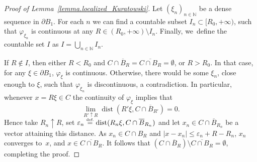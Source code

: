 \documentclass[10pt]{amsart}
\theoremstyle{definition}
\newcommand{\eqdef}{\ensuremath{\stackrel{\mbox{\upshape\tiny def.}}{=}}}
\DeclareMathOperator{\dist}{dist}
\newcommand{\oB}{\overline{B}}
\begin{document}
\begin{proof}[Proof of Lemma~\ref{lemma.localized_Kuratowski}]
Let $(\xi_n)_{n \in \mathbb{N}}$ be a dense sequence in $\partial B_1$.
For each $n$ we can find a countable subset $I_n\subset [R_0,+\infty)$, such that $\varphi_{\xi_n}$
is continuous at any $R\in (R_0,+\infty)\setminus I_n$.
Finally, we~define the countable set $I$ as
$
I= \bigcup_{n\in \mathbb{N}} I_n.
$

If $R\not\in I$, then either $R<R_0$ and
$C\cap\oB_R=\overline{C\cap B_R}=\emptyset$, or
$R>R_0$. In that case, for any $\xi\in\partial B_1$,
$\varphi_\xi$ is continuous. Otherwise, there would be some $\xi_n$,
close enough to $\xi$, such that $\varphi_{\xi_n}$ is discontinuous,
a contradiction. In particular, whenever $x = R\xi \in C$ the continuity of $\varphi_\xi$ implies that
\[
\lim_{R'\uparrow R}\dist(R'\xi,C\cap \oB_{R'})=0.
\]
Hence take $R_n \uparrow R$, set $\varepsilon_n \eqdef \dist(R_n\xi,C\cap \oB_{R_n})$ and let $x_n \in C\cap \oB_{R_n}$ be a vector attaining this distance. As $x_n \in C \cap B_R$ and $|x - x_n| \le \varepsilon_n + R - R_n$, $x_n$ converges to~$x$, and $x\in \overline{C\cap B_R}$. It follows that $(C\cap\oB_R)\setminus
\overline{C\cap B_R}=\emptyset$, completing the proof.
\end{proof}
\end{document}
